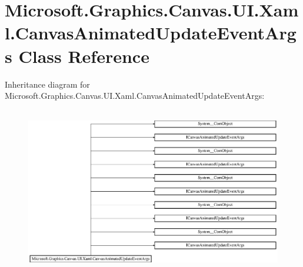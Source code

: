 \hypertarget{class_microsoft_1_1_graphics_1_1_canvas_1_1_u_i_1_1_xaml_1_1_canvas_animated_update_event_args}{}\section{Microsoft.\+Graphics.\+Canvas.\+U\+I.\+Xaml.\+Canvas\+Animated\+Update\+Event\+Args Class Reference}
\label{class_microsoft_1_1_graphics_1_1_canvas_1_1_u_i_1_1_xaml_1_1_canvas_animated_update_event_args}
Inheritance diagram for Microsoft.\+Graphics.\+Canvas.\+U\+I.\+Xaml.\+Canvas\+Animated\+Update\+Event\+Args\+:\begin{figure}[H]
\begin{center}
\leavevmode
\includegraphics[height=7.350835cm]{class_microsoft_1_1_graphics_1_1_canvas_1_1_u_i_1_1_xaml_1_1_canvas_animated_update_event_args}
\end{center}
\end{figure}
